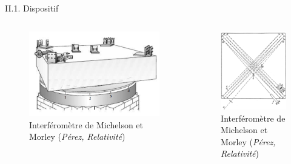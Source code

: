 \documentclass{beamer}
\begin{document}
\begin{frame}{II.1. Dispositif}
    \begin{columns}
        \begin{block}{}
            \begin{figure}
                \centering
                \includegraphics[width =1\textwidth]{MIchelsonMorley.png}
                \caption{Interféromètre de Michelson et Morley (\textit{Pérez, Relativité})}
            \end{figure}
        \end{block}
    \begin{block}{}
        \begin{figure}
            \centering
            \includegraphics[width =.6\textwidth]{MIchelsonMorley2.png}
            \caption{Interféromètre de Michelson et Morley (\textit{Pérez, Relativité})}
    \end{figure}
    \end{block}
    \end{columns}
\end{frame}
\end{document}
